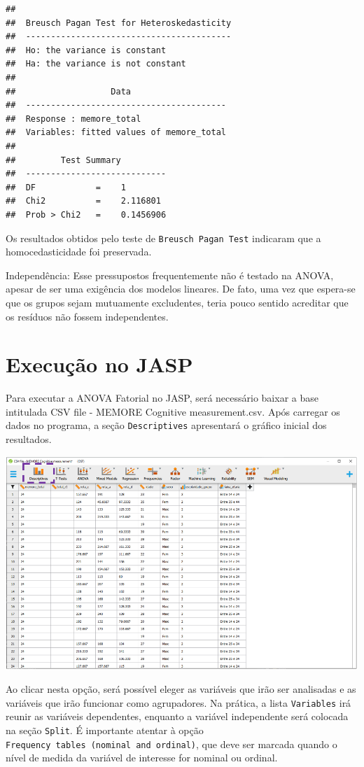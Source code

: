 \documentclass[
]{book}
\begin{document}
\begin{verbatim}
## 
##  Breusch Pagan Test for Heteroskedasticity
##  -----------------------------------------
##  Ho: the variance is constant            
##  Ha: the variance is not constant        
## 
##                   Data                   
##  ----------------------------------------
##  Response : memore_total 
##  Variables: fitted values of memore_total 
## 
##         Test Summary         
##  ----------------------------
##  DF            =    1 
##  Chi2          =    2.116801 
##  Prob > Chi2   =    0.1456906
\end{verbatim}

Os resultados obtidos pelo teste de \texttt{Breusch\ Pagan\ Test}
indicaram que a homocedasticidade foi preservada.

Independência: Esse pressupostos frequentemente não é testado na ANOVA,
apesar de ser uma exigência dos modelos lineares. De fato, uma vez que
espera-se que os grupos sejam mutuamente excludentes, teria pouco
sentido acreditar que os resíduos não fossem independentes.

\hypertarget{execuuxe7uxe3o-no-jasp-9}{%
\section{Execução no JASP}\label{execuuxe7uxe3o-no-jasp-9}}

Para executar a ANOVA Fatorial no JASP, será necessário baixar a base
intitulada CSV file - MEMORE Cognitive measurement.csv. Após carregar os
dados no programa, a seção \texttt{Descriptives} apresentará o gráfico
inicial dos resultados.

\includegraphics{./img/cap_anova_two_way_descriptives.png}

Ao clicar nesta opção, será possível eleger as variáveis que irão ser
analisadas e as variáveis que irão funcionar como agrupadores. Na
prática, a lista \texttt{Variables} irá reunir as variáveis dependentes,
enquanto a variável independente será colocada na seção \texttt{Split}.
É importante atentar à opção
\texttt{Frequency\ tables\ (nominal\ and\ ordinal)}, que deve ser
marcada quando o nível de medida da variável de interesse for nominal ou
ordinal.
\end{document}
